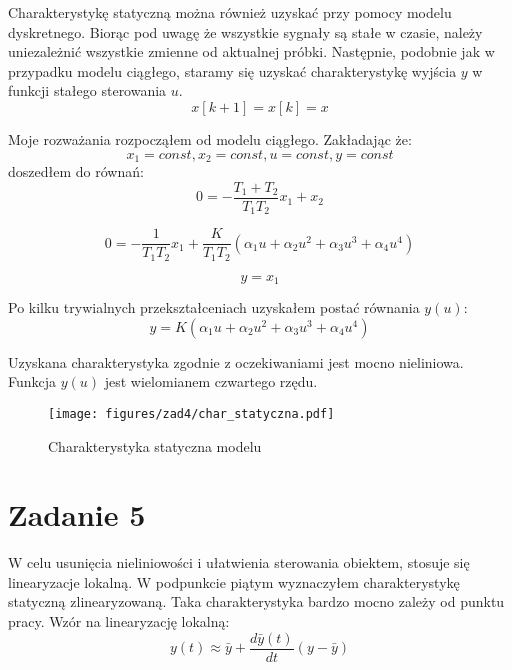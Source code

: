 \documentclass[a4paper,titlepage,11pt,floatssmall]{mwrep}
\begin{document}
\indent{} Charakterystykę statyczną można również uzyskać przy pomocy modelu dyskretnego. Biorąc pod uwagę że wszystkie sygnały są stałe w czasie, należy uniezależnić wszystkie zmienne od aktualnej próbki. Następnie, podobnie jak w przypadku modelu ciągłego, staramy się uzyskać charakterystykę wyjścia $y$ w funkcji stałego sterowania $u$.
\begin{equation*}
x[k+1] = x[k] = x  
\end{equation*}

\indent{} Moje rozważania rozpocząłem od modelu ciągłego. Zakładając że:
\begin{equation*}
x_1 = const, x_2 = const, u = const, y = const
\end{equation*}
doszedłem do równań:
\begin{equation*}
0 = - \frac{T_1 + T_2}{T_1 T_2} x_1 + x_2
\end{equation*}

\begin{equation*}
0 = - \frac{1}{T_1 T_2} x_1 + \frac{K}{T_1 T_2}(\alpha_1 u + \alpha_2 u^2 + \alpha_3 u^3 + \alpha_4 u^4) 
\end{equation*}

\begin{equation*}
y = x_1
\end{equation*}

Po kilku trywialnych przekształceniach uzyskałem postać równania $y(u)$:
\begin{equation*}
y = K(\alpha_1 u + \alpha_2 u^2 + \alpha_3 u^3 + \alpha_4 u^4) 
\end{equation*}

Uzyskana charakterystyka zgodnie z oczekiwaniami jest mocno nieliniowa. Funkcja $y(u)$ jest wielomianem czwartego rzędu.

\begin{figure}[H]
\centering
\texttt{[image: figures/zad4/char\_statyczna.pdf]}
\caption{Charakterystyka statyczna modelu}
\end{figure}

\section{Zadanie 5}
\indent{} W celu usunięcia nieliniowości i ułatwienia sterowania obiektem, stosuje się linearyzacje lokalną. W podpunkcie piątym wyznaczyłem charakterystykę statyczną zlinearyzowaną. Taka charakterystyka bardzo mocno zależy od punktu pracy. Wzór na linearyzację lokalną:
\begin{equation*}
y(t) \approx \bar{y} + \frac{d\bar{y}(t)}{dt}(y - \bar{y}) 
\end{equation*}
\end{document}

